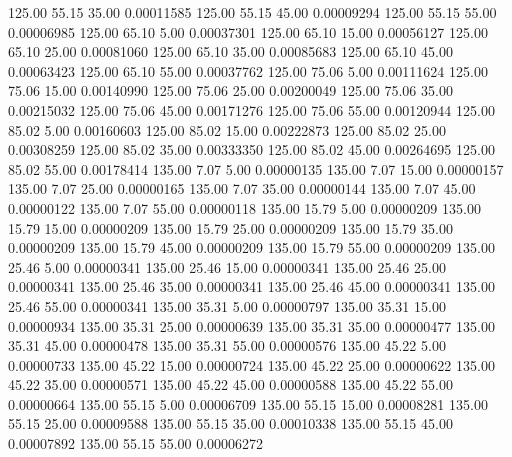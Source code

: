     125.00     55.15     35.00     0.00011585
    125.00     55.15     45.00     0.00009294
    125.00     55.15     55.00     0.00006985
    125.00     65.10      5.00     0.00037301
    125.00     65.10     15.00     0.00056127
    125.00     65.10     25.00     0.00081060
    125.00     65.10     35.00     0.00085683
    125.00     65.10     45.00     0.00063423
    125.00     65.10     55.00     0.00037762
    125.00     75.06      5.00     0.00111624
    125.00     75.06     15.00     0.00140990
    125.00     75.06     25.00     0.00200049
    125.00     75.06     35.00     0.00215032
    125.00     75.06     45.00     0.00171276
    125.00     75.06     55.00     0.00120944
    125.00     85.02      5.00     0.00160603
    125.00     85.02     15.00     0.00222873
    125.00     85.02     25.00     0.00308259
    125.00     85.02     35.00     0.00333350
    125.00     85.02     45.00     0.00264695
    125.00     85.02     55.00     0.00178414
    135.00      7.07      5.00     0.00000135
    135.00      7.07     15.00     0.00000157
    135.00      7.07     25.00     0.00000165
    135.00      7.07     35.00     0.00000144
    135.00      7.07     45.00     0.00000122
    135.00      7.07     55.00     0.00000118
    135.00     15.79      5.00     0.00000209
    135.00     15.79     15.00     0.00000209
    135.00     15.79     25.00     0.00000209
    135.00     15.79     35.00     0.00000209
    135.00     15.79     45.00     0.00000209
    135.00     15.79     55.00     0.00000209
    135.00     25.46      5.00     0.00000341
    135.00     25.46     15.00     0.00000341
    135.00     25.46     25.00     0.00000341
    135.00     25.46     35.00     0.00000341
    135.00     25.46     45.00     0.00000341
    135.00     25.46     55.00     0.00000341
    135.00     35.31      5.00     0.00000797
    135.00     35.31     15.00     0.00000934
    135.00     35.31     25.00     0.00000639
    135.00     35.31     35.00     0.00000477
    135.00     35.31     45.00     0.00000478
    135.00     35.31     55.00     0.00000576
    135.00     45.22      5.00     0.00000733
    135.00     45.22     15.00     0.00000724
    135.00     45.22     25.00     0.00000622
    135.00     45.22     35.00     0.00000571
    135.00     45.22     45.00     0.00000588
    135.00     45.22     55.00     0.00000664
    135.00     55.15      5.00     0.00006709
    135.00     55.15     15.00     0.00008281
    135.00     55.15     25.00     0.00009588
    135.00     55.15     35.00     0.00010338
    135.00     55.15     45.00     0.00007892
    135.00     55.15     55.00     0.00006272
